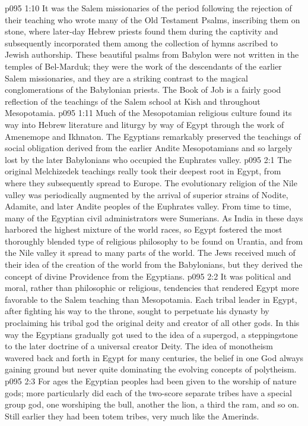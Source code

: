 \vs p095 1:10 \pc It was the Salem missionaries of the period following the rejection of their teaching who wrote many of the Old Testament Psalms, inscribing them on stone, where later\hyp{}day Hebrew priests found them during the captivity and subsequently incorporated them among the collection of hymns ascribed to Jewish authorship. These beautiful psalms from Babylon were not written in the temples of Bel\hyp{}Marduk; they were the work of the descendants of the earlier Salem missionaries, and they are a striking contrast to the magical conglomerations of the Babylonian priests. The Book of Job is a fairly good reflection of the teachings of the Salem school at Kish and throughout Mesopotamia.
\vs p095 1:11 Much of the Mesopotamian religious culture found its way into Hebrew literature and liturgy by way of Egypt through the work of Amenemope and Ikhnaton. The Egyptians remarkably preserved the teachings of social obligation derived from the earlier Andite Mesopotamians and so largely lost by the later Babylonians who occupied the Euphrates valley.
\vs p095 2:1 The original Melchizedek teachings really took their deepest root in Egypt, from where they subsequently spread to Europe. The evolutionary religion of the Nile valley was periodically augmented by the arrival of superior strains of Nodite, Adamite, and later Andite peoples of the Euphrates valley. From time to time, many of the Egyptian civil administrators were Sumerians. As India in these days harbored the highest mixture of the world races, so Egypt fostered the most thoroughly blended type of religious philosophy to be found on Urantia, and from the Nile valley it spread to many parts of the world. The Jews received much of their idea of the creation of the world from the Babylonians, but they derived the concept of divine Providence from the Egyptians.
\vs p095 2:2 It was political and moral, rather than philosophic or religious, tendencies that rendered Egypt more favorable to the Salem teaching than Mesopotamia. Each tribal leader in Egypt, after fighting his way to the throne, sought to perpetuate his dynasty by proclaiming his tribal god the original deity and creator of all other gods. In this way the Egyptians gradually got used to the idea of a supergod, a steppingstone to the later doctrine of a universal creator Deity. The idea of monotheism wavered back and forth in Egypt for many centuries, the belief in one God always gaining ground but never quite dominating the evolving concepts of polytheism.
\vs p095 2:3 For ages the Egyptian peoples had been given to the worship of nature gods; more particularly did each of the two\hyp{}score separate tribes have a special group god, one worshiping the bull, another the lion, a third the ram, and so on. Still earlier they had been totem tribes, very much like the Amerinds.
